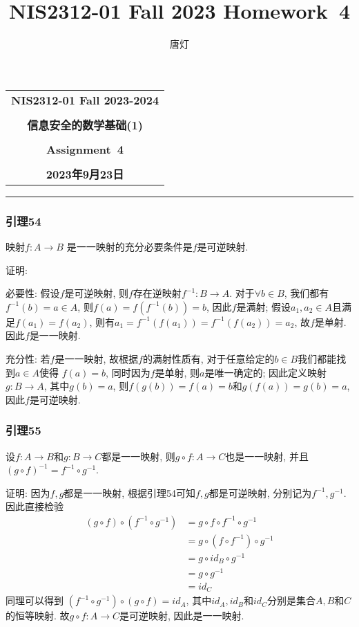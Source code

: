 \documentclass[a4paper,12pt]{ctexart}
\title{NIS2312-01 Fall 2023 Homework~4}
\author{唐灯}
\begin{document}
  \begin{center}

  \vspace{-0.3in}
  \begin{tabular}{c}
    \textbf{\Large NIS2312-01 Fall 2023-2024} \\
    \textbf{\Large  } \\
    \textbf{\Large  信息安全的数学基础(1)} \\
    \textbf{\Large  } \\
    \textbf{\Large  Assignment~4} \\
    \textbf{\Large  } \\
    \textbf{\Large 2023年9月23日} \\
  \end{tabular}
  \end{center}
  \noindent
  \rule{\linewidth}{0.4pt}
  
\subsubsection*{引理54}
    映射$f:A\rightarrow B$ 是一一映射的充分必要条件是$f$是可逆映射.

    证明:  
    
    必要性: 假设$f$是可逆映射, 则$f$存在逆映射$f^{-1}:B\rightarrow A$. 对于$\forall b\in B$, 我们都有$f^{-1}(b)=a\in A$, 则$f(a)=f(f^{-1}(b))=b$, 因此$f$是满射; 假设$a_1,a_2\in A$且满足$f(a_1)=f(a_2)$, 则有$a_1=f^{-1}(f(a_1))=f^{-1}(f(a_2))=a_2$, 故$f$是单射. 因此$f$是一一映射.

    充分性: 若$f$是一一映射, 故根据$f$的满射性质有, 对于任意给定的$b\in B$我们都能找到$a\in A$使得 $f(a)=b$, 同时因为$f$是单射, 则$a$是唯一确定的; 因此定义映射$g:B\rightarrow A$, 其中$g(b)=a$, 则$f(g(b))=f(a)=b$和$g(f(a))=g(b)=a$, 因此$f$是可逆映射.

\subsubsection*{引理55}
    设$f:A\rightarrow B$和$g:B\rightarrow C$都是一一映射, 则$g\circ f:A\rightarrow C$也是一一映射, 并且$(g\circ f)^{-1} = f^{-1}\circ g^{-1}$.

    证明: 因为$f,g$都是一一映射, 根据引理54可知$f,g$都是可逆映射, 分别记为$f^{-1},g^{-1}$. 因此直接检验
    \begin{align*}
        (g\circ f)\circ(f^{-1}\circ g^{-1}) &=g\circ f\circ f^{-1}\circ g^{-1}\\
                                            &=g\circ (f\circ f^{-1})\circ g^{-1}\\
                                            &=g\circ id_B\circ g^{-1}\\
                                            &=g\circ g^{-1}\\
                                            &=id_C 
    \end{align*}
    同理可以得到 $(f^{-1}\circ g^{-1})\circ(g\circ f)=id_A$, 其中$id_A,id_B$和$id_C$分别是集合$A,B$和$C$的恒等映射.
    故$g\circ f:A\rightarrow C$是可逆映射, 因此是一一映射. 
\end{document}
